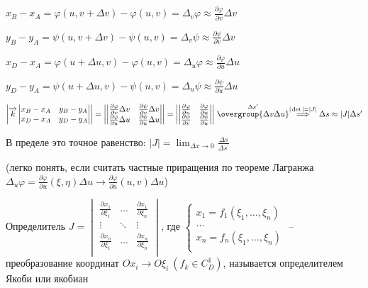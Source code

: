 \documentclass[12pt]{article}
\begin{document}
    $x_B - x_A = \varphi(u, v + \Delta v) - \varphi(u, v) = \Delta_v \varphi \approx \frac{\partial \varphi}{\partial v}\Delta v$

    $y_B - y_A = \psi(u, v + \Delta v) - \psi(u, v) = \Delta_v \psi \approx \frac{\partial \psi}{\partial v}\Delta v$

    $x_D - x_A = \varphi(u + \Delta u, v) - \varphi(u, v) = \Delta_u \varphi \approx \frac{\partial \varphi}{\partial u}\Delta u$

    $y_D - y_A = \psi(u + \Delta u, v) - \psi(u, v) = \Delta_u \psi \approx \frac{\partial \psi}{\partial u}\Delta u$

    $\left| \overrightarrow{k}
    \begin{vmatrix}
        x_B - x_A & y_B - y_A \\
        x_D - x_A & y_D - y_A
    \end{vmatrix}\right| = \left|
    \begin{vmatrix}
        \frac{\partial \varphi}{\partial v}\Delta v & \frac{\partial \psi}{\partial v}\Delta v \\
        \frac{\partial \varphi}{\partial u}\Delta u & \frac{\partial \psi}{\partial u}\Delta u
    \end{vmatrix}\right| = \left|
    \begin{vmatrix}
        \frac{\partial \varphi}{\partial u} & \frac{\partial \varphi}{\partial u} \\
        \frac{\partial \psi}{\partial v}    & \frac{\partial \psi}{\partial u}
    \end{vmatrix}\right| \stackrel{\Delta s^\prime}{\overgroup{\Delta v \Delta u}} \stackrel{|\det| = |J|}{\Longrightarrow} \Delta s \approx |J|\Delta s^\prime$

    \Nota В пределе это точное равенство: $|J| = \lim_{\Delta x \to 0} \frac{\Delta s}{\Delta s^\prime}$

    (легко понять, если считать частные приращения по теореме Лагранжа $\Delta_u \varphi = \frac{\partial \varphi}{\partial u}(\xi, \eta) \Delta u \rightarrow \frac{\partial \varphi}{\partial u}(u, v) \Delta u$)

    \hypertarget{determinantJaсobi}{}

    \Def Определитель $J = \begin{vmatrix}
        \frac{\partial x_1}{\partial \xi_1} & \dots  & \frac{\partial x_1}{\partial \xi_n} \\
        \vdots & \ddots & \vdots \\
        \frac{\partial x_n}{\partial \xi_1} & \dots  & \frac{\partial x_n}{\partial \xi_n} \\
    \end{vmatrix}$, где $\begin{cases}
                             x_1 = f_1(\xi_1, \dots, \xi_n) \\
                             \dots \\
                             x_n = f_n(\xi_1, \dots, \xi_n) \\
    \end{cases}$ -- преобразование координат $Ox_i \to O\xi_i \ (f_k \in C^1_D)$, называется определителем Якоби или якобиан
\end{document}
